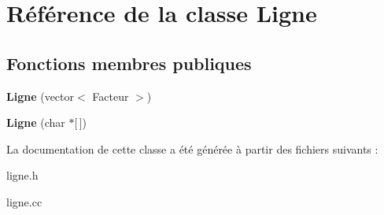 \hypertarget{classLigne}{\section{\-Référence de la classe \-Ligne}
\label{classLigne}
}
\subsection*{\-Fonctions membres publiques}
\begin{DoxyCompactItemize}
\item 
\hypertarget{classLigne_a7065d8ee1a96e034b1c6ccb2381ef767}{{\bfseries \-Ligne} (vector$<$ \-Facteur $>$)}\label{classLigne_a7065d8ee1a96e034b1c6ccb2381ef767}

\item 
\hypertarget{classLigne_ad2784e24dbadc42517f2165c59c0b29d}{{\bfseries \-Ligne} (char $\ast$\mbox{[}$\,$\mbox{]})}\label{classLigne_ad2784e24dbadc42517f2165c59c0b29d}

\end{DoxyCompactItemize}


\-La documentation de cette classe a été générée à partir des fichiers suivants \-:\begin{DoxyCompactItemize}
\item 
ligne.\-h\item 
ligne.\-cc\end{DoxyCompactItemize}
